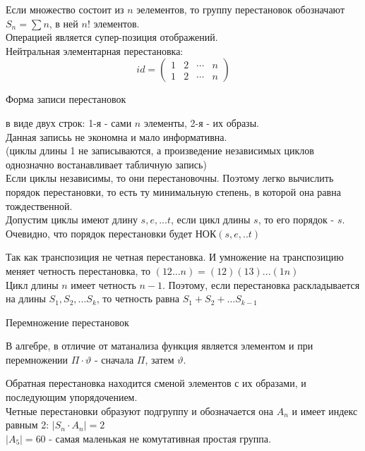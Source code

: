 Если множество состоит из $n$ эелементов, то группу перестановок обозначают
$S_n = \sum n$, в ней $n!$ элементов.\\
Операцией является супер-позиция отображений.\\
Нейтральная элементарная перестановка:\\
\begin{displaymath}
id = \left(\begin{array}{lccr}
1 & 2 & \cdots & n\\
1 & 2 & \cdots & n
\end{array}\right)
\end{displaymath}

\begin{title}[\Large]
  Форма записи перестановок
\end{title}

 в виде двух строк: 1-я - сами $n$ элементы, 2-я - их
образы.\\
Данная записьь не экономна и мало информативна.\\
 (циклы длины 1 не
записываются, а произведение независимых циклов однозначно востанавливает
табличную запись)\\

Если циклы независимы, то они перестановочны. Поэтому легко вычислить порядок
перестановки, то есть ту минимальную степень, в которой она равна
тождественной.\\

Допустим циклы имеют длину $s, e, ... t$, если цикл длины $s$, то его порядок -
$s$. Очевидно, что порядок перестановки будет НОК$(s, e, .. t)$\\

\begin{defin}
  Так как транспозиция не четная перестановка. И умножение на транспозицию
  меняет четность перестановка, то $(12...n) = (12)(13)...(1n)$\\
  Цикл длины $n$ имеет четность $n - 1$. Поэтому, если перестановка
  раскладывается на длины $S_1, S_2, ... S_k$, то четность равна
  $S_1 + S_2 + ... S_{k - 1}$
\end{defin}

\begin{title}[\Large]
  Перемножение перестановок
\end{title}

В алгебре, в отличие от матанализа функция является элементом и при перемножении
$\Pi \cdot \vartheta$ - сначала $\Pi$, затем $\vartheta$.

Обратная перестановка находится сменой элементов с их образами, и последующим
упорядочением.\\

Четные перестановки образуют подгруппу и обозначается она $A_n$ и имеет индекс
равным 2: $|S_n \cdot A_n| = 2$\\
$|A_5| = 60$ - самая маленькая не комутативная простая группа.